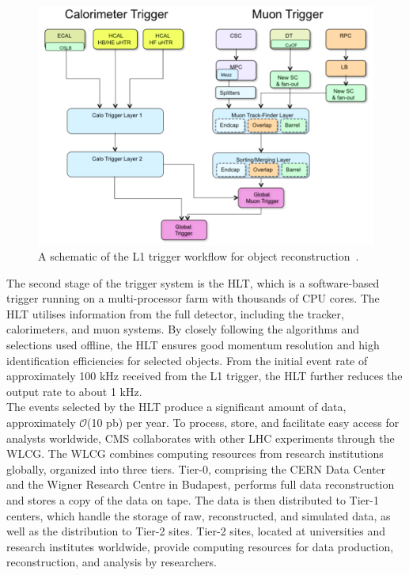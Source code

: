 \begin{figure}[!hbtp]
    \centering
    \includegraphics[width=\textwidth]{Figures/trigger.png}
    \caption{A schematic of the L1 trigger workflow for object reconstruction~\cite{Tapper:2013yva}.}
    \label{fig:trigger}
\end{figure}

The second stage of the trigger system is the \ac{HLT}, which is a software-based trigger running on a multi-processor farm with thousands of CPU cores. 
The \ac{HLT} utilises information from the full detector, including the tracker, calorimeters, and muon systems. 
By closely following the algorithms and selections used offline, the \ac{HLT} ensures good momentum resolution and high identification efficiencies for selected objects. 
From the initial event rate of approximately 100 kHz received from the \ac{L1} trigger, the \ac{HLT} further reduces the output rate to about 1 kHz. \\

The events selected by the \ac{HLT} produce a significant amount of data, approximately $\mathcal{O}$(10 pb) per year. 
To process, store, and facilitate easy access for analysts worldwide, \ac{CMS} collaborates with other \ac{LHC} experiments through the \ac{WLCG}. 
The \ac{WLCG} combines computing resources from research institutions globally, organized into three tiers. 
Tier-0, comprising the CERN Data Center and the Wigner Research Centre in Budapest, performs full data reconstruction and stores a copy of the data on tape. 
The data is then distributed to Tier-1 centers, which handle the storage of raw, reconstructed, and simulated data, as well as the distribution to Tier-2 sites. 
Tier-2 sites, located at universities and research institutes worldwide, provide computing resources for data production, reconstruction, and analysis by researchers.
